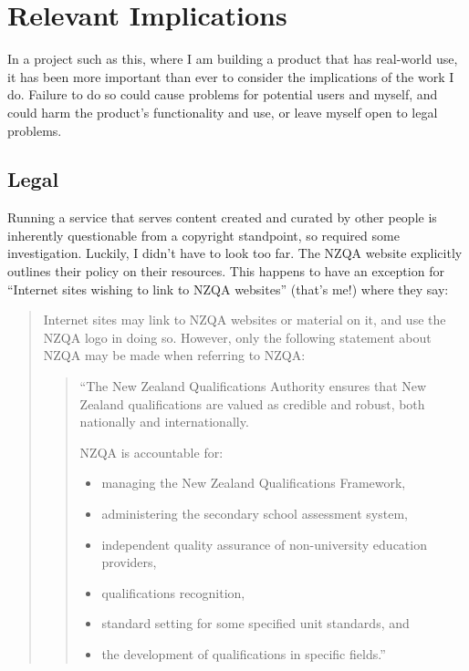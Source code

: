 \documentclass{article}
\begin{document}
\newpage

\section{Relevant Implications}
In a project such as this, where I am building a product that has real-world use, it has been more important than ever to consider the implications of the work I do. Failure to do so could cause problems for potential users and myself, and could harm the product's functionality and use, or leave myself open to legal problems.

\subsection*{Legal}
Running a service that serves content created and curated by other people is inherently questionable from a copyright standpoint, so required some investigation. Luckily, I didn't have to look too far. The NZQA website explicitly outlines their policy on their resources. This happens to have an exception for ``Internet sites wishing to link to NZQA websites'' (that's me!) where they say:

\begin{quote}
Internet sites may link to NZQA websites or material on it, and use the NZQA logo in doing so. However, only the following statement about NZQA may be made when referring to NZQA:
    
    \begin{quote}
    ``The New Zealand Qualifications Authority ensures that New Zealand qualifications are valued as credible and robust, both nationally and internationally.
    
    NZQA is accountable for:
    \begin{itemize}
        \item managing the New Zealand Qualifications Framework,
        \item administering the secondary school assessment system,
        \item independent quality assurance of non-university education providers,
        \item qualifications recognition,
        \item standard setting for some specified unit standards, and
        \item the development of qualifications in specific fields.''
    \end{itemize}
    \end{quote}
\end{quote}
\end{document}
